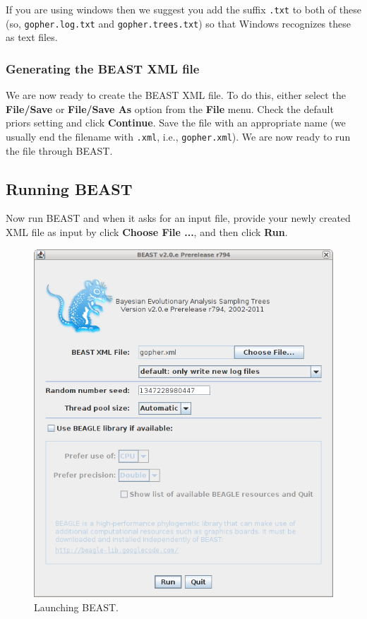 \documentclass{article}
\begin{document}
If you are using windows then we suggest you add the suffix \texttt{.txt} to both of these (so,
\texttt{gopher.log.txt} and \texttt{gopher.trees.txt}) so that Windows recognizes
these as text files. 

\subsubsection*{Generating the BEAST XML file }

We are now ready to create the BEAST XML file. To do this, either select the {\bf File/Save} or {\bf File/Save As} option from the \textbf{File} menu. Check the default priors setting and click \textbf{Continue}. Save the file with an appropriate name (we usually end the filename with \texttt{.xml}, i.e., \texttt{gopher.xml}). We are now ready to run the file through BEAST. 

\subsection*{Running BEAST }

Now run BEAST and when it asks for an input file, provide your newly
created XML file as input by click \textbf{Choose File ...}, and then click \textbf{Run}. 

\begin{figure}
\begin{center}

\includegraphics[scale=0.5]{figures/BEAST}

\end{center}
\caption{\label{fig.BEAST} Launching BEAST.}
\end{figure}
\end{document}
